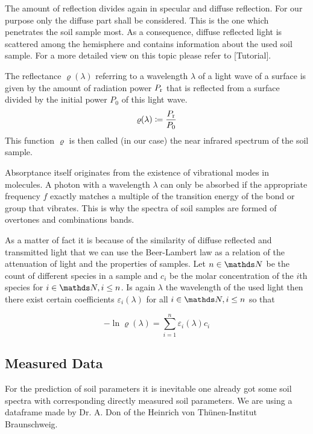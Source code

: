 		The amount of reflection divides again in specular and diffuse reflection.
		For our purpose only the diffuse part shall be considered.
		This is the one which penetrates the soil sample most.
		As a consequence, diffuse reflected light is scattered among the hemisphere and contains information about the used soil sample.
		For a more detailed view on this topic please refer to [Tutorial].

		The reflectance $\varrho(\lambda)$ referring to a wavelength $\lambda$ of a light wave of a surface is given by the amount of radiation power $P_{\mathrm{r}}$ that is reflected from a surface divided by the initial power $P_0$ of this light wave.
		\[
			\varrho(\lambda) \coloneqq \frac{P_{\mathrm{r}}}{P_0}
		\]
		This function $\varrho$ is then called (in our case) the near infrared spectrum of the soil sample.

		Absorptance itself originates from the existence of vibrational modes in molecules.
		A photon with a wavelength $\lambda$ can only be absorbed if the appropriate frequency $f$ exactly matches a multiple of the transition energy of the bond or group that vibrates.
		This is why the spectra of soil samples are formed of overtones and combinations bands.

		As a matter of fact it is because of the similarity of diffuse reflected and transmitted light that we can use the Beer-Lambert law as a relation of the attenuation of light and the properties of samples.
		Let $n\in\SN$ be the count of different species in a sample and $c_i$ be the molar concentration of the $i$th species for $i\in\SN,i\leq n$.
		Is again $\lambda$ the wavelength of the used light then there exist certain coefficients $\varepsilon_i(\lambda)$ for all $i\in\SN,i\leq n$ so that

		\[
			-\ln \varrho(\lambda) = \sum_{i=1}^{n} \varepsilon_i(\lambda) c_i
		\]


	\subsection{Measured Data}
	\label{ssec:measured-data}
	
		For the prediction of soil parameters it is inevitable one already got some soil spectra with corresponding directly measured soil parameters.
		We are using a dataframe made by Dr. A. Don of the Heinrich von Thünen-Institut Braunschweig.

